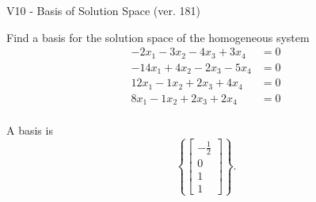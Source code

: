 \begin{exercise}
  \begin{exerciseTitle}V10 - Basis of Solution Space (ver. 181)\end{exerciseTitle}
  \begin{exerciseStatement}
    Find a basis for the solution space of the homogeneous system 
\begin{align*}
 -2 x_ 1 -3 x_ 2 -4 x_ 3 + 3 x_ 4 &= 0  \\ 
  -14 x_ 1 + 4 x_ 2 -2 x_ 3 -5 x_ 4 &= 0  \\ 
  12 x_ 1 -1 x_ 2 + 2 x_ 3 + 4 x_ 4 &= 0  \\ 
  8 x_ 1 -1 x_ 2 + 2 x_ 3 + 2 x_ 4 &= 0  \\ 
 \end{align*}


 
  \end{exerciseStatement}

  \begin{exerciseAnswer}
   A basis is   
\[\left\{\left[\begin{array}{c}
-\frac{1}{2} \\
0 \\
1 \\
1
\end{array}\right]\right\}.\]

  


  \end{exerciseAnswer}
\end{exercise}